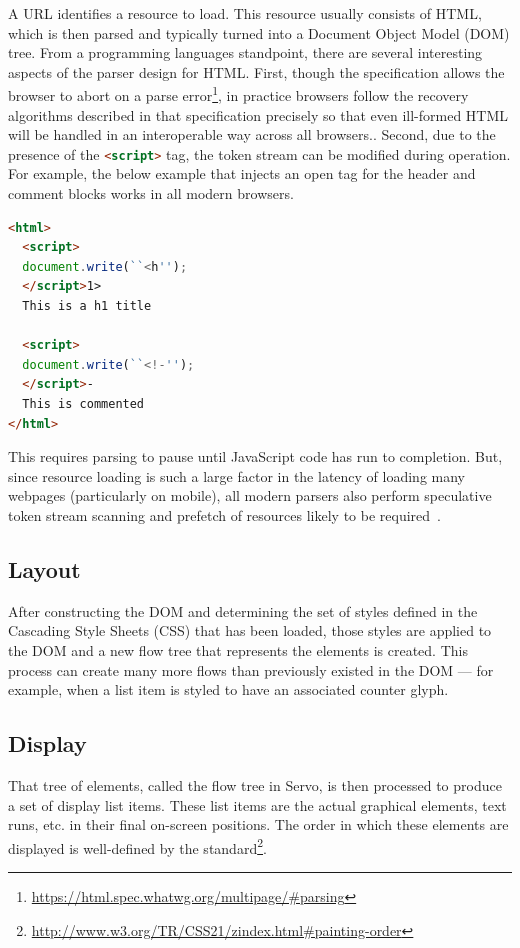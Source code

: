 A URL identifies a resource to load.
This resource usually consists of HTML, which is then parsed and typically turned into a Document Object
Model (DOM) tree.
From a programming languages standpoint, there are several interesting aspects of the parser design
for HTML.
First, though the specification allows the browser to abort on a parse error\footnote{\url{https://html.spec.whatwg.org/multipage/#parsing}},
in practice browsers follow the recovery algorithms described in that specification precisely so that
even ill-formed HTML will be handled in an interoperable way across all browsers..
Second, due to the presence of the \lstinline[language=HTML]{<script>} tag, the token stream can be modified
during operation.
For example, the below example that injects an open tag for the header and comment blocks works in all modern browsers.
\begin{lstlisting}[language=HTML]
<html>
  <script>
  document.write(``<h'');
  </script>1>
  This is a h1 title

  <script>
  document.write(``<!-'');
  </script>-
  This is commented
</html>
\end{lstlisting}
This requires parsing to pause until JavaScript code has run to completion.
But, since resource loading is such a large factor in the latency of loading many webpages (particularly on mobile),
all modern parsers also perform speculative token stream scanning and prefetch of resources likely to be required~\cite{browsers-slow-smartphones}.

\subsection{Layout}

After constructing the DOM and determining the set of styles defined in the Cascading Style Sheets (CSS) that has
been loaded, those styles are applied to the DOM and a new flow tree that represents the elements is created.
This process can create many more flows than previously existed in the DOM --- for example, when a list item is
styled to have an associated counter glyph.

\subsection{Display}

That tree of elements, called the flow tree in Servo, is then processed to produce a set of display list items.
These list items are the actual graphical elements, text runs, etc. in their final on-screen positions.
The order in which these elements are displayed is well-defined by the standard\footnote{\url{http://www.w3.org/TR/CSS21/zindex.html#painting-order}}.

